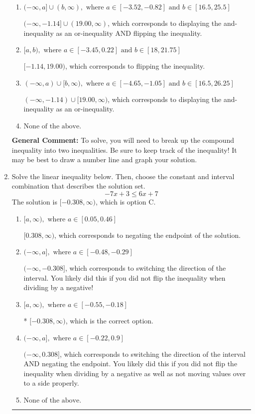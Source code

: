 \documentclass{extbook}[14pt]
\newcommand{\litem}[1]{\item #1

\rule{\textwidth}{0.4pt}}
\begin{document}
\begin{enumerate}
{\begin{enumerate}[label=\Alph*.]
* $(-1.14, 19.00]$, which is the correct option.
\item \( (-\infty, a] \cup (b, \infty), \text{ where } a \in [-3.52, -0.82] \text{ and } b \in [16.5, 25.5] \)

$(-\infty, -1.14] \cup (19.00, \infty)$, which corresponds to displaying the and-inequality as an or-inequality AND flipping the inequality.
\item \( [a, b), \text{ where } a \in [-3.45, 0.22] \text{ and } b \in [18, 21.75] \)

$[-1.14, 19.00)$, which corresponds to flipping the inequality.
\item \( (-\infty, a) \cup [b, \infty), \text{ where } a \in [-4.65, -1.05] \text{ and } b \in [16.5, 26.25] \)

$(-\infty, -1.14) \cup [19.00, \infty)$, which corresponds to displaying the and-inequality as an or-inequality.
\item \( \text{None of the above.} \)


\end{enumerate}

\textbf{General Comment:} To solve, you will need to break up the compound inequality into two inequalities. Be sure to keep track of the inequality! It may be best to draw a number line and graph your solution.
}
\litem{
Solve the linear inequality below. Then, choose the constant and interval combination that describes the solution set.
\[ -7x + 3 \leq 6x + 7 \]The solution is \( [-0.308, \infty) \), which is option C.\begin{enumerate}[label=\Alph*.]
\item \( [a, \infty), \text{ where } a \in [0.05, 0.46] \)

 $[0.308, \infty)$, which corresponds to negating the endpoint of the solution.
\item \( (-\infty, a], \text{ where } a \in [-0.48, -0.29] \)

 $(-\infty, -0.308]$, which corresponds to switching the direction of the interval. You likely did this if you did not flip the inequality when dividing by a negative!
\item \( [a, \infty), \text{ where } a \in [-0.55, -0.18] \)

* $[-0.308, \infty)$, which is the correct option.
\item \( (-\infty, a], \text{ where } a \in [-0.22, 0.9] \)

 $(-\infty, 0.308]$, which corresponds to switching the direction of the interval AND negating the endpoint. You likely did this if you did not flip the inequality when dividing by a negative as well as not moving values over to a side properly.
\item \( \text{None of the above}. \)


\end{enumerate}}
\end{enumerate}
\end{document}
